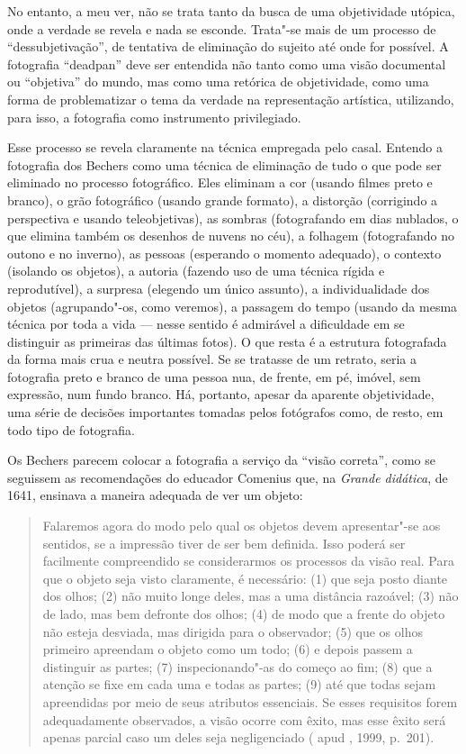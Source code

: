 No entanto, a meu ver, não se trata tanto da busca de uma objetividade
utópica, onde a verdade se revela e nada se esconde. Trata"-se mais de um
processo de ``dessubjetivação'', de tentativa de eliminação do sujeito
até onde for possível. A fotografia ``deadpan'' deve ser entendida não
tanto como uma visão documental ou ``objetiva'' do mundo, mas como uma
retórica de objetividade, como uma forma de problematizar o tema da
verdade na representação artística, utilizando, para isso, a fotografia
como instrumento privilegiado.

Esse processo se revela claramente na técnica empregada pelo casal.
Entendo a fotografia dos Bechers como uma técnica de eliminação de tudo
o que pode ser eliminado no processo fotográfico. Eles eliminam a cor
(usando filmes preto e branco), o grão fotográfico (usando grande
formato), a distorção (corrigindo a perspectiva e usando teleobjetivas),
as sombras (fotografando em dias nublados, o que elimina também os
desenhos de nuvens no céu), a folhagem (fotografando no outono e no
inverno), as pessoas (esperando o momento adequado), o contexto
(isolando os objetos), a autoria (fazendo uso de uma técnica rígida e
reprodutível), a surpresa (elegendo um único assunto), a individualidade
dos objetos (agrupando"-os, como veremos), a passagem do tempo (usando da
mesma técnica por toda a vida --- nesse sentido é admirável a dificuldade
em se distinguir as primeiras das últimas fotos). O que resta é a
estrutura fotografada da forma mais crua e neutra possível. Se se
tratasse de um retrato, seria a fotografia preto e branco de uma pessoa
nua, de frente, em pé, imóvel, sem expressão, num fundo branco. Há,
portanto, apesar da aparente objetividade, uma série de decisões
importantes tomadas pelos fotógrafos como, de resto, em todo tipo de
fotografia.

Os Bechers parecem colocar a fotografia a serviço da ``visão correta'',
como se seguissem as recomendações do educador Comenius que, na
\emph{Grande didática}, de 1641, ensinava a maneira adequada de ver um
objeto:

\begin{quote}
Falaremos agora do modo pelo qual os objetos devem apresentar"-se aos
sentidos, se a impressão tiver de ser bem definida. Isso poderá ser
facilmente compreendido se considerarmos os processos da visão real.
Para que o objeto seja visto claramente, é necessário: (1) que seja
posto diante dos olhos; (2) não muito longe deles, mas a uma distância
razoável; (3) não de lado, mas bem defronte dos olhos; (4) de modo que a
frente do objeto não esteja desviada, mas dirigida para o observador;
(5) que os olhos primeiro apreendam o objeto como um todo; (6) e depois
passem a distinguir as partes; (7) inspecionando"-as do começo ao fim;
(8) que a atenção se fixe em cada uma e todas as partes; (9) até que
todas sejam apreendidas por meio de seus atributos essenciais. Se esses
requisitos forem adequadamente observados, a visão ocorre com êxito, mas
esse êxito será apenas parcial caso um deles seja negligenciado
( apud , 1999, p.~201).
\end{quote}

